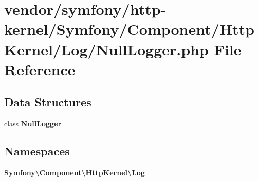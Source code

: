 \section{vendor/symfony/http-\/kernel/\+Symfony/\+Component/\+Http\+Kernel/\+Log/\+Null\+Logger.php File Reference}
\label{symfony_2http-kernel_2_symfony_2_component_2_http_kernel_2_log_2_null_logger_8php}
\subsection*{Data Structures}
\begin{DoxyCompactItemize}
\item 
class {\bf Null\+Logger}
\end{DoxyCompactItemize}
\subsection*{Namespaces}
\begin{DoxyCompactItemize}
\item 
 {\bf Symfony\textbackslash{}\+Component\textbackslash{}\+Http\+Kernel\textbackslash{}\+Log}
\end{DoxyCompactItemize}
